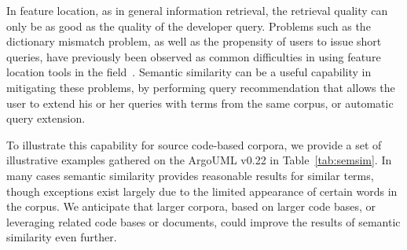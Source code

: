In feature location, as in general information retrieval, the retrieval quality
can only be as good as the quality of the developer query. Problems such as the
dictionary mismatch problem, as well as the propensity of users to issue short
queries, have previously been observed as common difficulties in using feature
location tools in the field~\cite{haiduc_effect_2011, damevski_field_2015}.
Semantic similarity can be a useful capability in mitigating these problems, by
performing query recommendation that allows the user to extend his or her
queries with terms from the same corpus, or automatic query extension.

To illustrate this capability for source code-based corpora, we provide a set of
illustrative examples gathered on the ArgoUML v0.22 in Table~\ref{tab:semsim}.
In many cases semantic similarity provides reasonable results for similar terms,
though exceptions exist largely due to the limited appearance of certain words
in the corpus.  We anticipate that larger corpora, based on larger code bases,
or leveraging related code bases or documents, could improve the results of
semantic similarity even further.


